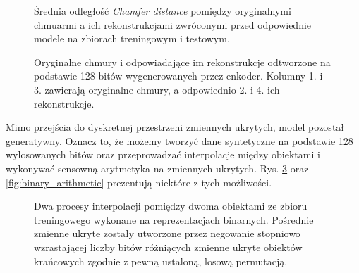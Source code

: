 \documentclass{iithesis}
\begin{document}
\begin{figure}
    \caption{\label{fig:increase_after_bin} Średnia odległość \textit{Chamfer distance} pomiędzy
    oryginalnymi chmuarmi a ich rekonstrukcjami zwróconymi przed odpowiednie modele na zbiorach
    treningowym i testowym.}
\end{figure}

\begin{figure}
    \caption{\label{fig:binary_reconstrucions} Oryginalne chmury i odpowiadające im
    rekonstrukcje odtworzone na podstawie 128 bitów wygenerowanych przez enkoder.
    Kolumny 1. i 3. zawierają oryginalne chmury, a odpowiednio 2. i 4. ich rekonstrukcje.}
\end{figure}

Mimo przejścia do dyskretnej przestrzeni zmiennych ukrytych, model pozostał generatywny.
Oznacz to, że możemy tworzyć dane syntetyczne na podstawie 128 wylosowanych bitów
oraz przeprowadzać interpolacje między obiektami i wykonywać sensowną arytmetyka na zmiennych ukrytych.
Rys. \ref{fig:binary_interpolation} oraz \ref{fig:binary_arithmetic} prezentują niektóre
z tych możliwości.

\begin{figure}
    \caption{\label{fig:binary_interpolation} Dwa procesy interpolacji pomiędzy dwoma obiektami
    ze zbioru treningowego wykonane na reprezentacjach binarnych. Pośrednie zmienne ukryte
    zostały utworzone przez negowanie stopniowo wzrastającej liczby bitów różniących
    zmienne ukryte obiektów krańcowych zgodnie z pewną ustaloną, losową permutacją.}
\end{figure}
\end{document}
